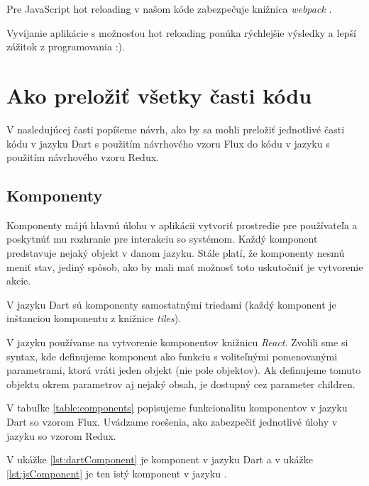 Pre JavaScript hot reloading v našom kóde zabezpečuje knižnica \emph{webpack} \cite{webpack}.

Vyvíjanie aplikácie s možnosťou hot reloading ponúka rýchlejšie výsledky a lepší zážitok z programovania :).

\section{Ako preložiť všetky časti kódu}

\NEW{}
V nasledujúcej časti popíšeme návrh, ako by sa mohli preložiť jednotlivé časti kódu v jazyku Dart s použitím návrhového vzoru Flux do kódu v jazyku \JS{} s použitím návrhového vzoru Redux.

\subsection{Komponenty}
\NEW{}
Komponenty májú hlavnú úlohu v aplikácii vytvoriť prostredie pre používateľa a poskytnúť mu rozhranie pre interakciu so systémom. Každý komponent predstavuje nejaký objekt v danom jazyku. 
Stále platí, že komponenty nesmú meniť stav, jediný spôsob, ako by mali mať možnosť toto uskutočniť je vytvorenie akcie.

V jazyku Dart sú komponenty samostatnými triedami (každý komponent je inštanciou komponentu z knižnice \emph{tiles}).

V jazyku \JS{} používame na vytvorenie komponentov knižnicu \emph{React}. Zvolili sme si syntax, kde definujeme komponent ako funkciu s voliteľnými pomenovanými parametrami, ktorá vráti jeden objekt (nie pole objektov). 
Ak definujeme tomuto objektu okrem parametrov aj nejaký obsah, je dostupný cez parameter children.%

V tabuľke \ref{table:components} popisujeme funkcionalitu komponentov v jazyku Dart so vzorom Flux. Uvádzame roešenia, ako zabezpečiť jednotlivé úlohy v jazyku \JS{} so vzorom Redux.

V ukážke \ref{lst:dartComponent} je komponent v jazyku Dart a v ukážke \ref{lst:jsComponent} je ten istý komponent v jazyku \JS{}.


